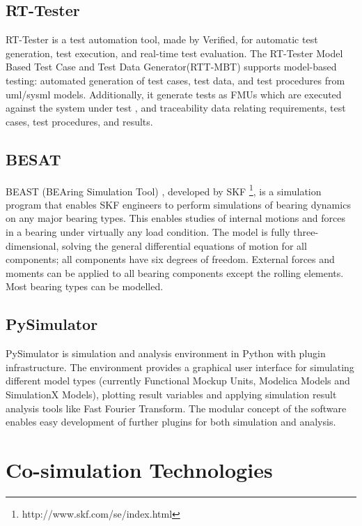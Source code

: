 \subsection{RT-Tester}
\label{sec:rttester}

RT-Tester \cite{rttester,rttester11} is a test automation tool, made by Verified, for automatic test generation, test execution, and real-time test evaluation. The RT-Tester Model Based Test Case and Test Data Generator(RTT-MBT) \cite{rttester,rttester13} supports model-based testing: automated generation of test cases, test data, and test procedures from \acrshort{uml}/\acrshort{sysml} models. Additionally, it generate tests as FMUs which are executed against the system under test , and traceability data relating requirements, test cases, test procedures, and results.

\subsection{BESAT}
\label{sec:beast}

BEAST (BEAring Simulation Tool) \cite{beast}, developed by SKF \footnote{http://www.skf.com/se/index.html}, is a simulation program that enables SKF engineers to perform simulations of bearing dynamics on any major bearing types. This enables studies of internal motions and forces in a bearing under virtually any load condition. The model is fully three-dimensional, solving the general differential equations of motion for all components; all components have six degrees of freedom. External forces and moments can be applied to all bearing components except the rolling elements. Most bearing types can be modelled.

\subsection{PySimulator}
\label{sec:pysimulator}

PySimulator \cite{pysimulator} is simulation and analysis environment in Python with plugin infrastructure. The environment provides a graphical user interface for simulating different model types (currently Functional Mockup Units, Modelica Models and SimulationX Models), plotting result variables and applying simulation result analysis tools like Fast Fourier Transform. The modular concept of the software enables easy development of further plugins for both simulation and analysis. 

\section{Co-simulation Technologies}
\label{sec:cosimulaiton}


